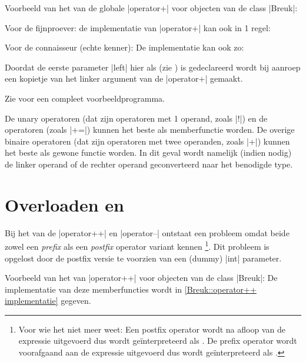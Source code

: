 \begin{cpplstShortInline}
Voorbeeld van het  van de globale |operator+| voor objecten van de class |Breuk|:

Voor de fijnproever: de implementatie van |operator+| kan ook in 1 regel:

Voor de connaisseur (echte kenner): De implementatie kan ook zo:

Doordat de eerste parameter |left| hier als  (zie ) is gedeclareerd wordt bij aanroep  een kopietje van het linker argument van de |operator+| gemaakt.

Zie  voor een compleet voorbeeldprogramma.

De unary operatoren (dat zijn operatoren met 1 operand, zoals |!|) en de  operatoren (zoals |+=|) kunnen het beste als memberfunctie  worden. De overige binaire operatoren (dat zijn operatoren met twee operanden, zoals |+|) kunnen het beste als gewone functie  worden. 
In dit geval wordt namelijk (indien nodig) de linker operand of de rechter operand geconverteerd naar het benodigde type.

\section[Overloaden \texttt{operator++} en \texttt{operator--}]{Overloaden \texorpdfstring{}{operator++} en \texorpdfstring{}{operator--}}
Bij het  van de |operator++| en |operator--| ontstaat een probleem omdat beide zowel een \emph{prefix} als een \emph{postfix} operator variant kennen%
\footnote{%
	Voor wie het niet meer weet: Een postfix operator \cppcode{++} wordt na afloop van de expressie uitgevoerd dus  wordt geïnterpreteerd als . 
	De prefix operator \cppcode{++} wordt voorafgaand aan de expressie uitgevoerd dus  wordt geïnterpreteerd als .
}. 
Dit probleem is opgelost door de postfix versie te voorzien van een (dummy) |int| parameter. 

Voorbeeld van het  van |operator++| voor objecten van de class |Breuk|:
De implementatie van deze memberfuncties wordt in \cref{Breuk::operator++ implementatie} gegeven.


\end{cpplstShortInline}
